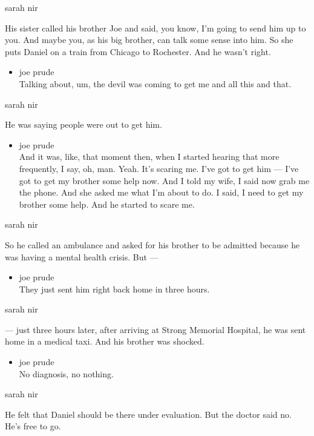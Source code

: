 sarah nir

His sister called his brother Joe and said, you know, I'm going to send
him up to you. And maybe you, as his big brother, can talk some sense
into him. So she puts Daniel on a train from Chicago to Rochester. And
he wasn't right.

\begin{itemize}
\tightlist
\item
  joe prude\\
  Talking about, um, the devil was coming to get me and all this and
  that.
\end{itemize}

sarah nir

He was saying people were out to get him.

\begin{itemize}
\tightlist
\item
  joe prude\\
  And it was, like, that moment then, when I started hearing that more
  frequently, I say, oh, man. Yeah. It's scaring me. I've got to get him
  --- I've got to get my brother some help now. And I told my wife, I
  said now grab me the phone. And she asked me what I'm about to do. I
  said, I need to get my brother some help. And he started to scare me.
\end{itemize}

sarah nir

So he called an ambulance and asked for his brother to be admitted
because he was having a mental health crisis. But ---

\begin{itemize}
\tightlist
\item
  joe prude\\
  They just sent him right back home in three hours.
\end{itemize}

sarah nir

--- just three hours later, after arriving at Strong Memorial Hospital,
he was sent home in a medical taxi. And his brother was shocked.

\begin{itemize}
\tightlist
\item
  joe prude\\
  No diagnosis, no nothing.
\end{itemize}

sarah nir

He felt that Daniel should be there under evaluation. But the doctor
said no. He's free to go.

